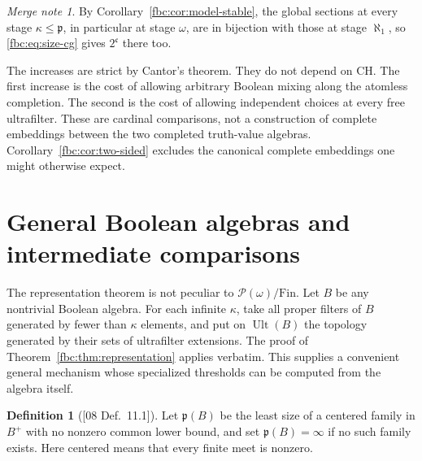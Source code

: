 \documentclass[11pt,letterpaper]{article}
\theoremstyle{definition}
\newtheorem{definition}[theorem]{Definition}
\theoremstyle{remark}
\newtheorem*{mergenote}{Merge note}
\newcommand{\om}{\omega}
\newcommand{\Fin}{\mathrm{Fin}}
\newcommand{\pow}{\mathcal P}
\newcommand{\cp}{\mathfrak p}
\newcommand{\cc}{\mathfrak c}
\newcommand{\Ult}{\operatorname{Ult}}
\newcommand{\src}[1]{\textup{[#1]}}
\begin{document}
\begin{mergenote}
By Corollary~\ref{fbc:cor:model-stable}, the global sections at every
stage $\kappa\leq\cp$, in particular at stage $\om$, are in bijection
with those at stage $\aleph_1$, so \eqref{fbc:eq:size-cg} gives $2^\cc$
there too.
\end{mergenote}

The increases are strict by Cantor's theorem. They do not depend on CH.
The first increase is the cost of allowing arbitrary Boolean mixing
along the atomless completion. The second is the cost of allowing
independent choices at every free ultrafilter. These are cardinal
comparisons, not a construction of complete embeddings between the two
completed truth-value algebras. Corollary~\ref{fbc:cor:two-sided}
excludes the canonical complete embeddings one might otherwise expect.

\section{General Boolean algebras and intermediate comparisons}
\label{fbc:sec:general}

The representation theorem is not peculiar to $\pow(\om)/\Fin$.
Let $B$ be any nontrivial Boolean algebra. For each infinite
$\kappa$, take all proper filters of $B$ generated by fewer than
$\kappa$ elements, and put on $\Ult(B)$ the topology generated by
their sets of ultrafilter extensions. The proof of
Theorem~\ref{fbc:thm:representation} applies verbatim. This supplies
a convenient general mechanism whose specialized thresholds can
be computed from the algebra itself.

\begin{definition}[\src{08 Def.~11.1}]\label{fbc:def:general-p}
Let $\mathfrak p(B)$ be the least size of a centered family in
$B^+$ with no nonzero common lower bound, and set
$\mathfrak p(B)=\infty$ if no such family exists. Here centered
means that every finite meet is nonzero.
\end{definition}
\end{document}
